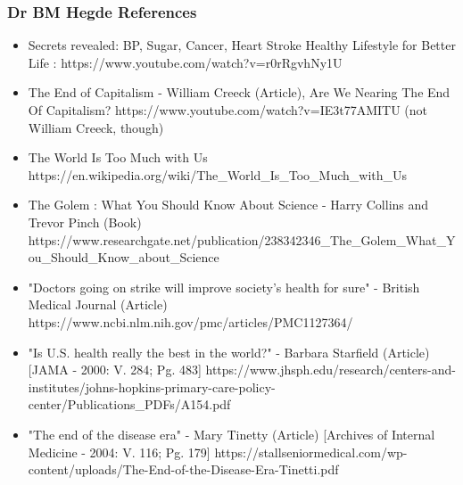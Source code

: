 \begin{frame}[fragile]\frametitle{Dr BM Hegde References}
	\begin{itemize}
	\item Secrets revealed: BP, Sugar, Cancer, Heart Stroke Healthy Lifestyle for Better Life : https://www.youtube.com/watch?v=r0rRgvhNy1U 
	\item The End of Capitalism - William Creeck (Article), Are We Nearing The End Of Capitalism?  https://www.youtube.com/watch?v=IE3t77AMITU  (not William Creeck, though)
	\item The World Is Too Much with Us https://en.wikipedia.org/wiki/The\_World\_Is\_Too\_Much\_with\_Us   
	\item The Golem : What You Should Know About Science - Harry Collins and Trevor Pinch (Book) https://www.researchgate.net/publication/238342346\_The\_Golem\_What\_You\_Should\_Know\_about\_Science 
	\item "Doctors going on strike will improve society's health for sure" - British Medical Journal (Article) https://www.ncbi.nlm.nih.gov/pmc/articles/PMC1127364/ 
	\item "Is U.S. health really the best in the world?" - Barbara Starfield (Article) [JAMA - 2000: V. 284; Pg. 483] https://www.jhsph.edu/research/centers-and-institutes/johns-hopkins-primary-care-policy-center/Publications\_PDFs/A154.pdf 
	\item "The end of the disease era" - Mary Tinetty (Article) [Archives of Internal Medicine - 2004: V. 116; Pg. 179] https://stallseniormedical.com/wp-content/uploads/The-End-of-the-Disease-Era-Tinetti.pdf 
	\end{itemize}

\end{frame}

